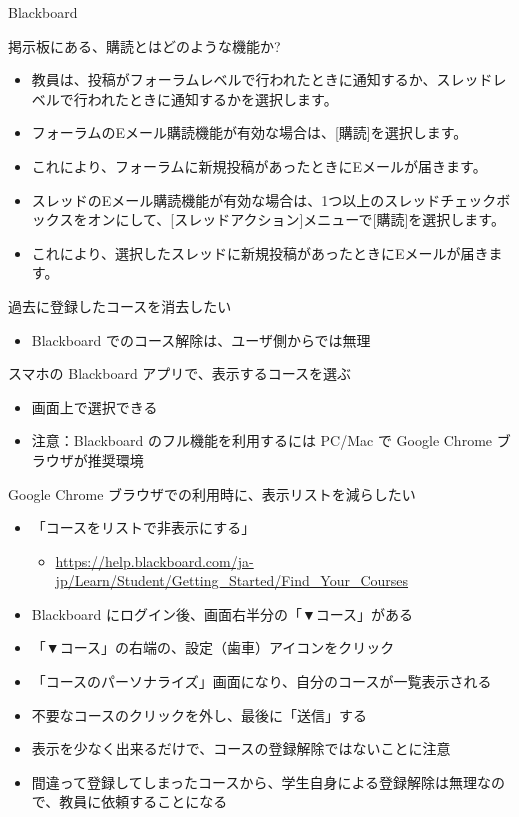 \documentclass[a4j,10pt]{jsarticle}
\def\lthtmlcheckvsize{\ifdim\ht\sizebox<\vsize 
  \ifdim\wd\sizebox<\hsize\expandafter\hfill\fi \expandafter\vfill
  \else\expandafter\vss\fi}%
\begin{document}
{\begin{frame}[label={sec:org166405d},fragile]{Blackboard}
\begin{block}{掲示板にある、購読とはどのような機能か?}
\begin{itemize}
\item 教員は、投稿がフォーラムレベルで行われたときに通知するか、スレッドレベルで行われたときに通知するかを選択します。
\item フォーラムのEメール購読機能が有効な場合は、[購読]を選択します。
\item これにより、フォーラムに新規投稿があったときにEメールが届きます。
\item スレッドのEメール購読機能が有効な場合は、1つ以上のスレッドチェックボックスをオンにして、[スレッドアクション]メニューで[購読]を選択します。
\item これにより、選択したスレッドに新規投稿があったときにEメールが届きます。
\end{itemize}
\end{block}
\par
\begin{block}{過去に登録したコースを消去したい}
\begin{itemize}
\item Blackboard でのコース解除は、ユーザ側からでは無理
\end{itemize}
\end{block}
\par
\begin{block}{スマホの Blackboard アプリで、表示するコースを選ぶ}
\begin{itemize}
\item 画面上で選択できる
\item 注意：Blackboard のフル機能を利用するには PC/Mac で Google Chrome ブラウザが推奨環境
\end{itemize}
\end{block}
\par
\begin{block}{Google Chrome ブラウザでの利用時に、表示リストを減らしたい}
\begin{itemize}
\item 「コースをリストで非表示にする」
\begin{itemize}
\item \url{https://help.blackboard.com/ja-jp/Learn/Student/Getting\_Started/Find\_Your\_Courses}
\end{itemize}
\par
\item Blackboard にログイン後、画面右半分の「▼コース」がある
\item 「▼コース」の右端の、設定（歯車）アイコンをクリック
\item 「コースのパーソナライズ」画面になり、自分のコースが一覧表示される
\item 不要なコースのクリックを外し、最後に「送信」する
\item 表示を少なく出来るだけで、コースの登録解除ではないことに注意
\item 間違って登録してしまったコースから、学生自身による登録解除は無理なので、教員に依頼することになる
\end{itemize}
\end{block}
\end{frame}%
\lthtmlfigureZ
\lthtmlcheckvsize\clearpage}
\end{document}
